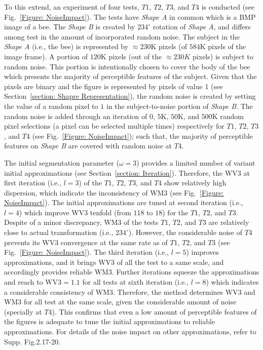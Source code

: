 To this extend, an experiment of four tests, $T1$, $T2$, $T3$, and $T4$ is conducted (see Fig.~\ref{Figure: NoiseImpact}). The tests have \textit{Shape A} in common which is a BMP image of a bee. The \textit{Shape B} is created by $234^\circ$ rotation of \textit{Shape A}, and differs among test in the amount of incorporated random noise. The subject in the \textit{Shape A} (i.e., the bee) is represented by $\approx230$K pixels (of $584$K pixels of the image frame). A portion of $120$K pixels (out of the $\approx230K$ pixels) is subject to random noise. This portion is intentionally chosen to cover the body of the bee which presents the majority of perceptible features of the subject. Given that the pixels are binary and the figure is represented by pixels of value 1 (see Section~\ref{section: Shapre Representation}), the random noise is created by setting the value of a random pixel to $1$ in the subject-to-noise portion of \textit{Shape B}. The random noise is added through an iteration of $0$, $5$K, $50$K, and $500$K random pixel selections (a pixel can be selected multiple times) respectively for $T1$, $T2$, $T3$, and $T4$ (see Fig.~\ref{Figure: NoiseImpact}); such that, the majority of perceptible features on \textit{Shape B} are covered with random noise at $T4$. 

The initial segmentation parameter ($\omega = 3$) provides a limited number of variant initial approximations (see Section~\ref{section: Iteration}). Therefore, the WV3 at first iteration (i.e., $l=3$) of the $T1$, $T2$, $T3$, and $T4$ show relatively high dispersion, which indicate the inconsistency of WM3 (see Fig.~\ref{Figure: NoiseImpact}). The initial approximations are tuned at second iteration (i.e., $l=4$) which improve WV3 tenfold (from $118$ to $18$) for the $T1$, $T2$, and $T3$. Despite of a minor discrepancy, WM3 of the tests $T1$, $T2$, and $T3$ are relatively close to actual transformation (i.e., $234^\circ$). However, the considerable noise of $T4$ prevents its WV3 convergence at the same rate as of $T1$, $T2$, and $T3$ (see Fig.~\ref{Figure: NoiseImpact}). The third iteration (i.e., $l=5$) improves approximations, and it brings WV3 of all the test to a same scale, and accordingly provides reliable WM3. Further iterations squeeze the approximations and reach to $\text{WV3}=1.1$ for all tests at sixth iteration (i.e., $l=8$) which indicates a considerable consistency of WM3. Therefore, the method determines WV3 and WM3 for all test at the same scale, given the considerable amount of noise (specially at $T4$). This confirms that even a low amount of perceptible features of the figures is adequate to tune the initial approximations to reliable approximations. For details of the noise impact on other approximations, refer to Supp. Fig.2.17-20.

